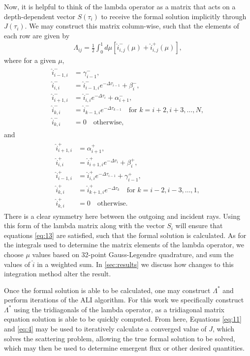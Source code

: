 \documentclass[12pt]{article}
\begin{document}
Now, it is helpful to think of the lambda operator as a matrix that acts on a depth-dependent vector $S(\tau_i)$ to receive the formal solution implicitly through $J(\tau_i)$. We may construct this matrix column-wise, such that the elements of each row are given by
\begin{align}
\Lambda_{ij} = \frac{1}{2} \int_0^1 d\mu \left[ \hat{i}^-_{i, j} (\mu) + \hat{i}^+_{i, j} (\mu) \right],
\end{align}
where for a given $\mu$,
\begin{align}
\begin{split}
\hat{i}_{i - 1, i}^-
&=
\gamma_{i - 1}^-,
\\
\hat{i}_{i, i}^-
&=
\hat{i}_{i - 1, i}^- e^{-\Delta\tau_{i - 1}} + \beta_{i}^-,
\\
\hat{i}_{i + 1, i}^-
&=
\hat{i}_{i, i}^- e^{-\Delta\tau_{i}} + \alpha_{i + 1}^-,
\\
\hat{i}_{k, i}^-
&=
\hat{i}_{k - 1, i}^- e^{-\Delta\tau_{k - 1}} \quad \text{for } k = i + 2, i + 3, \dots, N,
\\
\hat{i}_{k, i}^-
&=
0 \quad \text{otherwise},
\end{split}
\end{align}
and
\begin{align}
\begin{split}
\hat{i}_{i + 1, i}^+
&=
\alpha_{i + 1}^+,
\\
\hat{i}_{i, i}^+
&=
\hat{i}_{i + 1, i}^+ e^{-\Delta\tau_{i}} + \beta_{i}^+,
\\
\hat{i}_{i - 1, i}^+
&=
\hat{i}_{i, i}^+ e^{-\Delta\tau_{i - 1}} + \gamma_{i - 1}^+,
\\
\hat{i}_{k, i}^+
&=
\hat{i}_{k + 1, i}^+ e^{-\Delta\tau_k} \quad \text{for } k = i - 2, i - 3, \dots, 1,
\\
\hat{i}_{k, i}^+
&=
0 \quad \text{otherwise}.
\end{split}
\end{align}
There is a clear symmetry here between the outgoing and incident rays. Using this form of the lambda matrix along with the vector $S_i$ will ensure that equations \ref{eq:13} are satisfied, such that the formal solution is calculated. As for the integrals used to determine the matrix elements of the lambda operator, we choose $\mu$ values based on 32-point Gauss-Legendre quadrature, and sum the values of $\hat{i}$ in a weighted sum. In \autoref{sec:results} we discuss how changes to this integration method alter the result.

Once the formal solution is able to be calculated, one may construct $\Lambda^*$ and perform iterations of the ALI algorithm. For this work we specifically construct $\Lambda^*$ using the tridiagonals of the lambda operator, as a tridiagonal matrix equation solution is able to be quickly computed. From here, Equations \ref{eq:11} and \ref{eq:4} may be used to iteratively calculate a converged value of $J$, which solves the scattering problem, allowing the true formal solution to be solved, which may then be used to determine emergent flux or other desired quantities.
\end{document}
